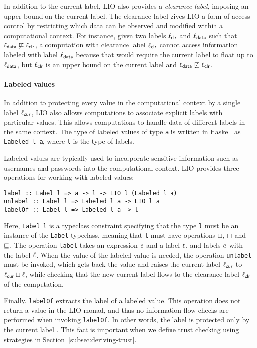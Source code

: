 In addition to the current label, LIO also provides a \emph{clearance label}, imposing an upper bound on the current label. The clearance label gives LIO a form of access control by restricting which data can be observed and modified within a computational context. For instance, given two labels $\ell_{\mathsf{clr}}$ and $\ell_{\mathsf{data}}$ such that $\ell_{\mathsf{data}} \not\sqsubseteq \ell_{\mathsf{clr}}$, a computation with clearance label $\ell_{\mathsf{clr}}$ cannot access information labeled with label $\ell_{\mathsf{data}}$ because that would require the current label to float up to $\ell_{\mathsf{data}}$, but $\ell_{\mathsf{clr}}$ is an upper bound on the current label and $\ell_{\mathsf{data}} \not\sqsubseteq \ell_{\mathsf{clr}}$.

\paragraph{Labeled values}
In addition to protecting every value in the computational context by a single label $\ell_{\mathsf{cur}}$, LIO also allows computations to associate explicit labels with particular values. This allows computations to handle data of different labels in the same context. The type of labeled values of type \texttt{a} is written in Haskell as \texttt{Labeled l a}, where \texttt{l} is the type of labels.

Labeled values are typically used to incorporate sensitive information such as usernames and passwords into the computational context. LIO provides three operations for working with labeled values:
\begin{verbatim}
label :: Label l => a -> l -> LIO l (Labeled l a)
unlabel :: Label l => Labeled l a -> LIO l a
labelOf :: Label l => Labeled l a -> l
\end{verbatim}
Here, \texttt{Label l} is a typeclass constraint specifying that the type \texttt{l} must be an instance of the \texttt{Label} typeclass, meaning that \texttt{l} must have operations $\sqcup$, $\sqcap$ and $\sqsubseteq$. The operation \texttt{label} takes an expression $e$ and a label $\ell$, and labels $e$ with the label $\ell$. When the value of the labeled value is needed, the operation \texttt{unlabel} must be invoked, which gets back the value and raises the current label $\ell_{\mathsf{cur}}$ to $\ell_{\mathsf{cur}} \sqcup \ell$, while checking that the new current label flows to the clearance label $\ell_{\mathsf{clr}}$ of the computation.

Finally, \texttt{labelOf} extracts the label of a labeled value. This operation does not return a value in the LIO monad, and thus no information-flow checks are performed when invoking \texttt{labelOf}. In other words, the label is protected only by the current label \cite{SRMMlio}. This fact is important when we define trust checking using strategies in Section~\ref{subsec:deriving-trust}.

